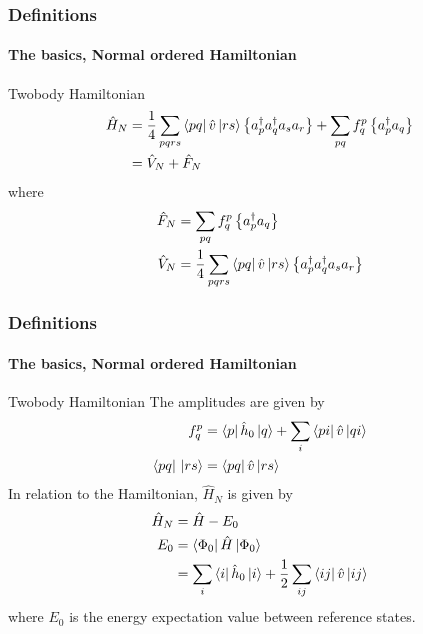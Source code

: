 \begin{frame}
    \frametitle{Definitions}
    \framesubtitle{The basics, Normal ordered Hamiltonian}

    \begin{block}{Twobody Hamiltonian}
    \begin{align*}
        \hat{H}_N &= 
            \frac{1}{4} \sum_{pqrs} \bra{pq}\hat{v}\,|{rs}\rangle \left\{a^\dagger_p a^\dagger_q a_s  a_r\right\} 
            + \sum_{pq} f_q^p \left\{a^\dagger_p a_q\right\} \\
        &= \hat{V}_N + \hat{F}_N
    \end{align*}
    where
    \begin{subequations}
    \begin{align*}
        \hat{F}_N &= \sum_{pq} f_q^p \left\{a^\dagger_p a_q\right\} \\
        \hat{V}_N &= \frac{1}{4} \sum_{pqrs} \bra{pq}\hat{v}\,|{rs}\rangle \left\{a^\dagger_p a^\dagger_q a_s  a_r\right\} \\
    \end{align*}
    \end{subequations}
    \end{block}
\end{frame}
\begin{frame}[fragile]
    \frametitle{Definitions}
    \framesubtitle{The basics, Normal ordered Hamiltonian}

    \small
    \begin{block}{Twobody Hamiltonian}
    The amplitudes are given by
    \begin{subequations}
    \begin{align*}
        f_q^p &= \bra{p}\hat{h}_0\,|{q}\rangle + \sum_i \bra{pi}\hat{v}\,|{qi}\rangle \\
        \bra{pq}\,|{rs}\rangle &= \bra{pq}\hat{v}\,|{rs}\rangle
    \end{align*}
    \end{subequations}
    In relation to the Hamiltonian, $\hat{H}_N$ is given by
    \begin{align*}
        \hat{H}_N &= \hat{H} - E_0 \\
        E_0 &= \bra{\Phi_0}\hat{H}\,|{\Phi_0}\rangle \\
            &= \sum_i \bra{i}\hat{h}_0\,|{i}\rangle
                + \frac{1}{2} \sum_{ij} \bra{ij}\hat{v}\,|{ij}\rangle
    \end{align*}
    where $E_0$ is the energy expectation value between reference states.
    \end{block}
\end{frame}


